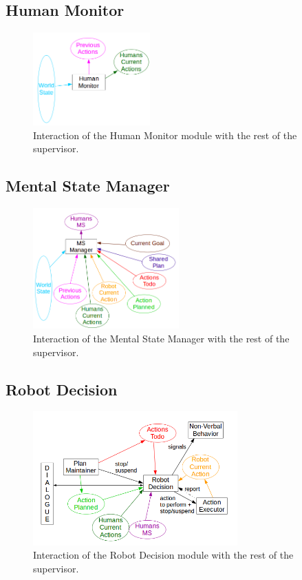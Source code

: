 \documentclass[english,a4paper,11pt,twoside]{StyleThese}
\begin{document}
\subsection{Human Monitor}

\begin{figure}[!h]
	\centering
    \includegraphics[width=0.4\textwidth]{figs/Chapter2/HumanMonitor.png}
    \caption{Interaction of the Human Monitor module with the rest of the supervisor.}
    \label{fig:humanMonitor}
\end{figure}

\subsection{Mental State Manager}

\begin{figure}[!h]
	\centering
    \includegraphics[width=0.5\textwidth]{figs/Chapter2/MSManager.png}
    \caption{Interaction of the Mental State Manager with the rest of the supervisor.}
    \label{fig:MSManager}
\end{figure}

\subsection{Robot Decision}

\begin{figure}[!h]
	\centering
    \includegraphics[width=0.7\textwidth]{figs/Chapter2/RobotDecision.png}
    \caption{Interaction of the Robot Decision module with the rest of the supervisor.}
    \label{fig:robotDecition}
\end{figure}
\end{document}
